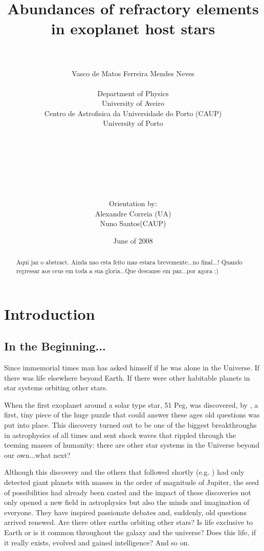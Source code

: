 \documentclass[dvips,12pt,a4paper]{report}
\title{Abundances of refractory elements in exoplanet host stars}
\author{\\
\\
Vasco de Matos Ferreira Mendes Neves \\ [4mm]
\\
Department of Physics \\
University of Aveiro \\
Centro de Astrofisica da Universidade do Porto (CAUP) \\
University of Porto
\\
\\
\\
\\
\\
\\
\\
\\
Orientation by:\\
Alexandre Correia (UA) \\ Nuno Santos(CAUP)}
\date{June of 2008}
\begin{document}
\maketitle
\begin{abstract}
 Aqui jaz o abstract. Ainda nao esta feito mas estara brevemente...no final...! Quando regressar aos ceus em toda a sua gloria...Que descanse em paz...por agora ;)
\end{abstract}
\newpage
\tableofcontents
\newpage



\chapter{Introduction}

\section{In the Beginning...}

\indent\indent Since immemorial times man has asked himself if he was alone in the Universe. If there was life elsewhere beyond Earth. If there were other habitable planets in star systems orbiting other stars.

When the first exoplanet around a solar type star, 51 Peg, was discovered, by \citet{Mayor-1995}, %
a first, tiny piece of the huge puzzle that could answer these ages old questions was put into place. This discovery turned out to be one of the biggest breakthroughs in astrophysics of all times and sent shock waves that rippled through the teeming masses of humanity: there are other star systems in the Universe beyond our own...what next?

\indent Although this discovery and the others that followed shortly (e.g. \citeauthor{Marcy-1996} \citeyear{Marcy-1996}) had only detected giant planets with masses in the order of magnitude of Jupiter, the seed of possibilities had already been casted and the impact of these discoveries not only  opened a new field in astrophysics but also the minds and imagination of everyone. They have inspired passionate debates and, suddenly, old questions arrived renewed. Are there other earths orbiting other stars? Is life exclusive to Earth or is it common throughout the galaxy and the universe? Does this life, if it really exists, evolved and gained intelligence? And so on. 
\end{document}
